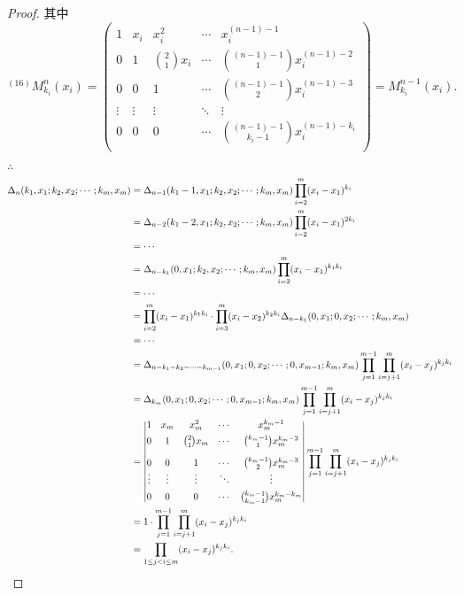 \documentclass[color=black,device=normal,lang=cn,mode=geye]{elegantnote}
\begin{document}
\begin{landscape}
\begin{proof}
    其中
    \[^{(16)}M_{k_i}^n(x_i)=\begin{pmatrix}
        1 & x_i & x_i^2 & \cdots & x_i^{(n-1)-1} \\[4pt]
        0 & 1 & \binom{2}{1}x_i & \cdots & \binom{(n-1)-1}{1}x_i^{(n-1)-2} \\[10pt]
        0 & 0 & 1 & \cdots & \binom{(n-1)-1}{2}x_i^{(n-1)-3} \\
        \vdots & \vdots & \vdots & \ddots & \vdots \\[4pt]
        0 & 0 & 0 & \cdots & \binom{(n-1)-1}{k_i-1}x_i^{(n-1)-k_i} \\
    \end{pmatrix}=M^{n-1}_{k_i}(x_i).\]

    $\therefore$
    \begin{align*}
        \Delta_n(k_1,x_1;k_2,x_2;\cdots;k_m,x_m) & =\Delta_{n-1}(k_1-1,x_1;k_2,x_2;\cdots;k_m,x_m)\prod\limits_{i=2}^m(x_i-x_1)^{k_i} \\
        & =\Delta_{n-2}(k_1-2,x_1;k_2,x_2;\cdots;k_m,x_m)\prod\limits_{i=2}^m(x_i-x_1)^{2k_i} \\
        & =\cdots \\
        & =\Delta_{n-k_1}(0,x_1;k_2,x_2;\cdots;k_m,x_m)\prod\limits_{i=2}^m(x_i-x_1)^{k_1k_i} \\
        & =\cdots \\
        & =\prod\limits_{i=2}^m(x_i-x_1)^{k_1k_i}\cdot\prod\limits_{i=3}^m(x_i-x_2)^{k_2k_i}\Delta_{n-k_1}(0,x_1;0,x_2;\cdots;k_m,x_m) \\
        & =\cdots \\
        & =\Delta_{n-k_1-k_2-\cdots-k_{m-1}}(0,x_1;0,x_2;\cdots;0,x_{m-1};k_m,x_m)\prod_{j=1}^{m-1}\prod\limits_{i=j+1}^m(x_i-x_j)^{k_jk_i} \\
        & =\Delta_{k_m}(0,x_1;0,x_2;\cdots;0,x_{m-1};k_m,x_m)\prod_{j=1}^{m-1}\prod\limits_{i=j+1}^m(x_i-x_j)^{k_jk_i} \\
        & =\begin{vmatrix}
            1 & x_m & x_m^2 & \cdots & x_m^{k_m-1} \\[4pt]
            0 & 1 & \binom{2}{1}x_m & \cdots & \binom{k_m-1}{1}x_m^{k_m-2} \\[10pt]
            0 & 0 & 1 & \cdots & \binom{k_m-1}{2}x_m^{k_m-3} \\
            \vdots & \vdots & \vdots & \ddots & \vdots \\[4pt]
            0 & 0 & 0 & \cdots & \binom{k_m-1}{k_m-1}x_m^{k_m-k_m} \\
        \end{vmatrix}\prod_{j=1}^{m-1}\prod\limits_{i=j+1}^m(x_i-x_j)^{k_jk_i} \\
        & =1\cdot\prod_{j=1}^{m-1}\prod\limits_{i=j+1}^m(x_i-x_j)^{k_jk_i} \\
        & =\prod\limits_{1\leq j<i\leq m}(x_i-x_j)^{k_jk_i}.\qedhere
    \end{align*}
\end{proof}
\end{landscape}
\end{document}
